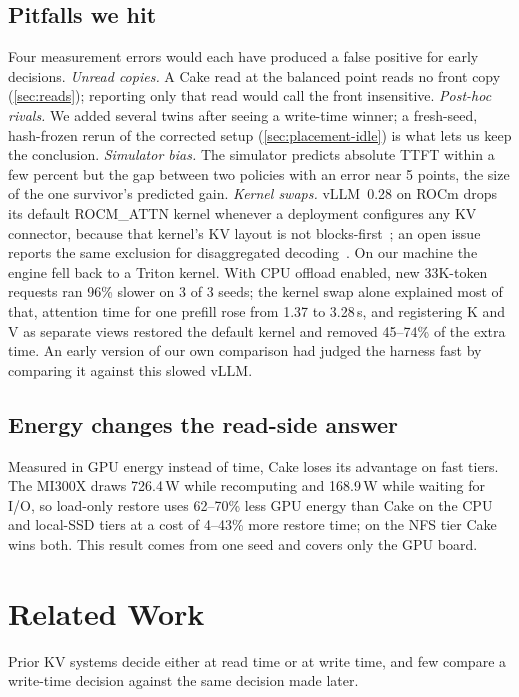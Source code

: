 \documentclass[conference]{IEEEtran}
\begin{document}
\subsection{Pitfalls we hit}
Four measurement errors would each have produced a false positive for early decisions.
\emph{Unread copies.} A Cake read at the balanced point reads no front copy (\cref{sec:reads}); reporting only that read would call the front insensitive.
\emph{Post-hoc rivals.} We added several twins after seeing a write-time winner; a fresh-seed, hash-frozen rerun of the corrected setup (\cref{sec:placement-idle}) is what lets us keep the conclusion.
\emph{Simulator bias.} The simulator predicts absolute TTFT within a few percent but the gap between two policies with an error near 5 points, the size of the one survivor's predicted gain.
\emph{Kernel swaps.} vLLM~0.28 on ROCm drops its default ROCM\_ATTN kernel whenever a deployment configures any KV connector, because that kernel's KV layout is not blocks-first~\cite{vllm_pr43660}; an open issue reports the same exclusion for disaggregated decoding~\cite{vllm_issue60316}.
On our machine the engine fell back to a Triton kernel.
With CPU offload enabled, new 33K-token requests ran 96\% slower on 3 of 3 seeds; the kernel swap alone explained most of that, attention time for one prefill rose from 1.37 to 3.28\,s, and registering K and V as separate views restored the default kernel and removed 45--74\% of the extra time.
An early version of our own comparison had judged the harness fast by comparing it against this slowed vLLM.

\subsection{Energy changes the read-side answer}
Measured in GPU energy instead of time, Cake loses its advantage on fast tiers.
The MI300X draws 726.4\,W while recomputing and 168.9\,W while waiting for I/O, so load-only restore uses 62--70\% less GPU energy than Cake on the CPU and local-SSD tiers at a cost of 4--43\% more restore time; on the NFS tier Cake wins both.
This result comes from one seed and covers only the GPU board.

\section{Related Work}\label{sec:related}
Prior KV systems decide either at read time or at write time, and few compare a write-time decision against the same decision made later.
\end{document}
